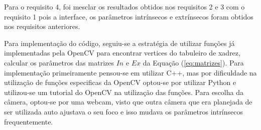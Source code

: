 Para o requisito 4, foi mesclar os resultados obtidos nos requisitos 2 e 3 com o requisito 1 pois a interface, os parâmetros intrínsecos e extrínsecos foram obtidos nos requisitos anteriores.

Para implementação do código, seguiu-se a estratégia de utilizar funções já implementadas pela OpenCV para encontrar vertices do tabuleiro de xadrez, calcular os parâmetros das matrizes $In$ e $Ex$ da Equação (\ref{eq:matrizes}). Para implementação primeiramente pensou-se em utilizar C++, mas por dificuldade na utilização de funções especificas da OpenCV optou-se por utilizar Python e utilizou-se um tutorial do OpenCV na utilização das funções\cite{CameraCalibrationTutorial}. Para escolha da câmera, optou-se por uma webcam, visto que outra câmera que era planejada de ser utilizada auto ajustava o seu foco e isso mudava os parâmetros intrínsecos frequentemente.